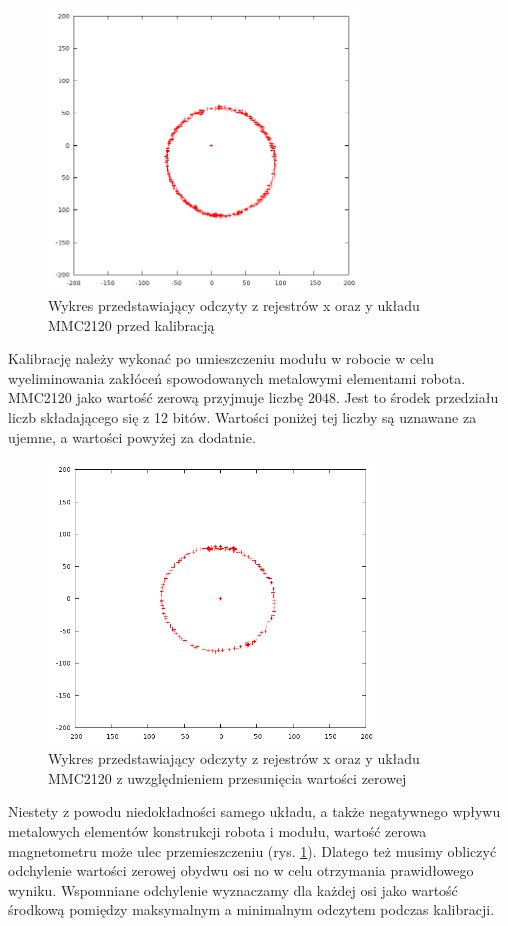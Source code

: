 \begin{figure}[!ht]
 \centering
 \includegraphics[height=75mm]{../images/ch04/mmc2120-without-callibration.png}
 \caption{Wykres przedstawiający odczyty z rejestrów x oraz y układu MMC2120 przed kalibracją}
 \label{fig:MMC2120NotCalibrated}
\end{figure}

Kalibrację należy wykonać po umieszczeniu modułu w robocie w celu wyeliminowania zakłóceń spowodowanych metalowymi elementami robota. MMC2120 jako wartość zerową przyjmuje liczbę $2048$. Jest to środek przedziału liczb składającego się z 12 bitów. Wartości poniżej tej liczby są uznawane za ujemne, a wartości powyżej za dodatnie.

\begin{figure}[!ht]
 \centering
 \includegraphics[height=75mm]{../images/ch04/mmc2120-with-callibration.png}
 \caption{Wykres przedstawiający odczyty z rejestrów x oraz y układu MMC2120 z uwzględnieniem przesunięcia wartości zerowej}
 \label{fig:MMC2120Calibrated}
\end{figure}

Niestety z powodu niedokładności samego układu, a także negatywnego wpływu metalowych elementów konstrukcji robota i modułu, wartość zerowa magnetometru może ulec przemieszczeniu (rys. \ref{fig:MMC2120NotCalibrated}). Dlatego też musimy obliczyć odchylenie wartości zerowej obydwu osi no w celu otrzymania prawidłowego wyniku. Wspomniane odchylenie wyznaczamy dla każdej osi jako wartość środkową pomiędzy maksymalnym a minimalnym odczytem podczas kalibracji.

